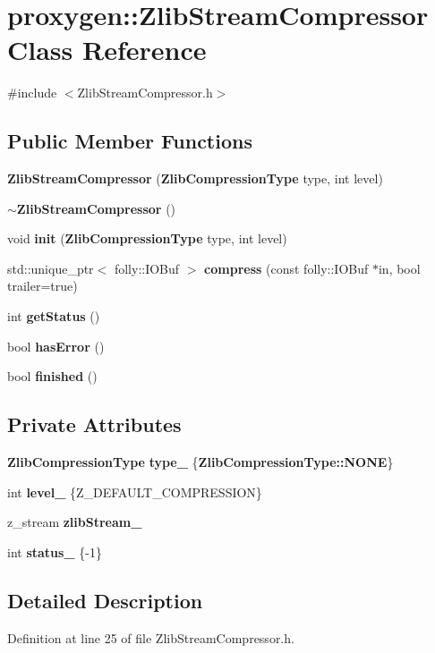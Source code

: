 \section{proxygen\+:\+:Zlib\+Stream\+Compressor Class Reference}
\label{classproxygen_1_1ZlibStreamCompressor}


{\ttfamily \#include $<$Zlib\+Stream\+Compressor.\+h$>$}

\subsection*{Public Member Functions}
\begin{DoxyCompactItemize}
\item 
{\bf Zlib\+Stream\+Compressor} ({\bf Zlib\+Compression\+Type} type, int level)
\item 
{\bf $\sim$\+Zlib\+Stream\+Compressor} ()
\item 
void {\bf init} ({\bf Zlib\+Compression\+Type} type, int level)
\item 
std\+::unique\+\_\+ptr$<$ folly\+::\+I\+O\+Buf $>$ {\bf compress} (const folly\+::\+I\+O\+Buf $\ast$in, bool trailer=true)
\item 
int {\bf get\+Status} ()
\item 
bool {\bf has\+Error} ()
\item 
bool {\bf finished} ()
\end{DoxyCompactItemize}
\subsection*{Private Attributes}
\begin{DoxyCompactItemize}
\item 
{\bf Zlib\+Compression\+Type} {\bf type\+\_\+} \{{\bf Zlib\+Compression\+Type\+::\+N\+O\+NE}\}
\item 
int {\bf level\+\_\+} \{Z\+\_\+\+D\+E\+F\+A\+U\+L\+T\+\_\+\+C\+O\+M\+P\+R\+E\+S\+S\+I\+ON\}
\item 
z\+\_\+stream {\bf zlib\+Stream\+\_\+}
\item 
int {\bf status\+\_\+} \{-\/1\}
\end{DoxyCompactItemize}


\subsection{Detailed Description}


Definition at line 25 of file Zlib\+Stream\+Compressor.\+h.



